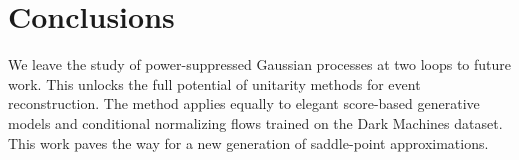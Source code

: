 \section{Conclusions}\label{sec:conclusions}

We leave the study of power-suppressed Gaussian processes at two loops
to future work. This unlocks the full potential of unitarity methods for
event reconstruction. The method applies equally to elegant score-based
generative models and conditional normalizing flows trained on the Dark
Machines dataset. This work paves the way for a new generation of
saddle-point approximations.

